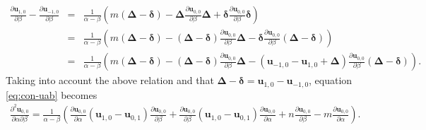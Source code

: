 \documentclass[dvips,10pt]{article}
\newcommand{\bs}{\boldsymbol}
\newcommand{\bsu}{ {\bs{u}}}
\theoremstyle{remark} %
\begin{document}
	\begin{eqnarray*}
		\frac{\partial {\bs{u}}_{1,0}}{\partial \beta}  - \frac{\partial {\bs{u}}_{-1,0}}{\partial \beta}  &=& \frac{1}{\alpha-\beta} \left(  m \left({\bs{\Delta}}-{\bs{\delta}}\right) - {\bs{\Delta}} \frac{\partial {\bs{u}}_{0,0}}{\partial \beta}  {\bs{\Delta}}  +
		{\bs{\delta}} \frac{\partial {\bs{u}}_{0,0}}{\partial \beta}  {\bs{\delta}}\right) \\
		&=& \frac{1}{\alpha-\beta} \left(  m \left({\bs{\Delta}}-{\bs{\delta}}\right) - \left({\bs{\Delta}}-{\bs{\delta}}\right) \frac{\partial {\bs{u}}_{0,0}}{\partial \beta}  {\bs{\Delta}} - {\bs{\delta}} \frac{\partial {\bs{u}}_{0,0}}{\partial \beta} \left({\bs{\Delta}}- {\bs{\delta}}\right) \right)  \\
		&=&  \frac{1}{\alpha-\beta} \left(  m \left({\bs{\Delta}}-{\bs{\delta}}\right) - \left({\bs{\Delta}}-{\bs{\delta}}\right) \frac{\partial {\bs{u}}_{0,0}}{\partial \beta}  {\bs{\Delta}} -  \left(  {\bs{u}}_{-1,0} -{\bs{u}}_{1,0} + {\bs{\Delta}}\right)  \frac{\partial {\bs{u}}_{0,0}}{\partial \beta} \left({\bs{\Delta}}- {\bs{\delta}}\right) \right).
	\end{eqnarray*}
	Taking into account the above relation and that ${\bs{\Delta}}- {\bs{\delta}} = \bsu_{1,0}-\bsu_{-1,0}$, equation \eqref{eq:con-uab} becomes
	\begin{eqnarray*} 
		\frac{\partial^2 {\bs{u}}_{0,0}}{\partial \alpha \partial \beta} = \frac{1}{\alpha-\beta} \left(  \frac{\partial {\bs{u}}_{0,0}}{\partial \alpha} \left({\bs{u}}_{1,0} -{\bs{u}}_{0,1}\right)  \frac{\partial {\bs{u}}_{0,0}}{\partial \beta} + \frac{\partial {\bs{u}}_{0,0}}{\partial \beta} \left({\bs{u}}_{1,0} -{\bs{u}}_{0,1}\right)  \frac{\partial {\bs{u}}_{0,0}}{\partial \alpha} + n \frac{\partial {\bs{u}}_{0,0}}{\partial \beta} -  m \frac{\partial {\bs{u}}_{0,0}}{\partial \alpha} \right).
	\end{eqnarray*}
	
\end{document}
